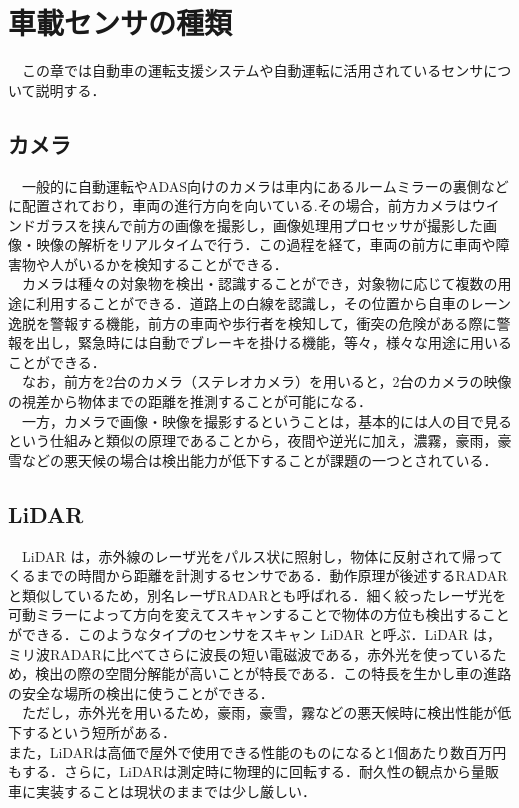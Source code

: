 \chapter{車載センサの種類}
　この章では自動車の運転支援システムや自動運転に活用されているセンサについて説明する．
\section{カメラ}
　一般的に自動運転やADAS向けのカメラは車内にあるルームミラーの裏側などに配置されており，車両の進行方向を向いている.その場合，前方カメラはウインドガラスを挟んで前方の画像を撮影し，画像処理用プロセッサが撮影した画像・映像の解析をリアルタイムで行う．この過程を経て，車両の前方に車両や障害物や人がいるかを検知することができる\cite{jidountenlab_sensor}．\\
　カメラは種々の対象物を検出・認識することができ，対象物に応じて複数の用途に利用することができる．道路上の白線を認識し，その位置から自車のレーン逸脱を警報する機能，前方の車両や歩行者を検知して，衝突の危険がある際に警報を出し，緊急時には自動でブレーキを掛ける機能，等々，様々な用途に用いることができる．\\
　なお，前方を2台のカメラ（ステレオカメラ）を用いると，2台のカメラの映像の視差から物体までの距離を推測することが可能になる\cite{denso_sensor}．\\
　一方，カメラで画像・映像を撮影するということは，基本的には人の目で見るという仕組みと類似の原理であることから，夜間や逆光に加え，濃霧，豪雨，豪雪などの悪天候の場合は検出能力が低下することが課題の一つとされている\cite{jidountenlab_sensor}．\\

\section{LiDAR}
　LiDAR は，赤外線のレーザ光をパルス状に照射し，物体に反射されて帰ってくるまでの時間から距離を計測するセンサである．動作原理が後述するRADARと類似しているため，別名レーザRADARとも呼ばれる．細く絞ったレーザ光を可動ミラーによって方向を変えてスキャンすることで物体の方位も検出することができる．このようなタイプのセンサをスキャン LiDAR と呼ぶ．LiDAR は，ミリ波RADARに比べてさらに波長の短い電磁波である，赤外光を使っているため，検出の際の空間分解能が高いことが特長である．この特長を生かし車の進路の安全な場所の検出に使うことができる．\\
　ただし，赤外光を用いるため，豪雨，豪雪，霧などの悪天候時に検出性能が低下するという短所がある\cite{denso_sensor}．
　\\また，LiDARは高価で屋外で使用できる性能のものになると1個あたり数百万円もする．さらに，LiDARは測定時に物理的に回転する．耐久性の観点から量販車に実装することは現状のままでは少し厳しい\cite{MITTechnologyReview_sensor}．

